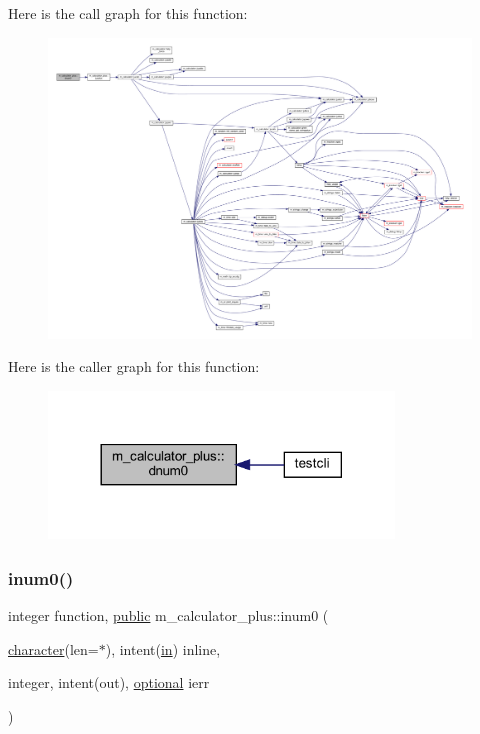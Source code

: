 Here is the call graph for this function\+:
\nopagebreak
\begin{figure}[H]
\begin{center}
\leavevmode
\includegraphics[width=350pt]{namespacem__calculator__plus_add45c0bb36bc796ee8a0354665f9397e_cgraph}
\end{center}
\end{figure}
Here is the caller graph for this function\+:
\nopagebreak
\begin{figure}[H]
\begin{center}
\leavevmode
\includegraphics[width=260pt]{namespacem__calculator__plus_add45c0bb36bc796ee8a0354665f9397e_icgraph}
\end{center}
\end{figure}
\mbox{\label{namespacem__calculator__plus_a3edbf94f311a3fad4a83fd8dfe26a61a}} 
\subsubsection{\texorpdfstring{inum0()}{inum0()}}
{\footnotesize\ttfamily integer function, \hyperlink{M__stopwatch_83_8txt_a2f74811300c361e53b430611a7d1769f}{public} m\+\_\+calculator\+\_\+plus\+::inum0 (\begin{DoxyParamCaption}\item[{\hyperlink{option__stopwatch_83_8txt_abd4b21fbbd175834027b5224bfe97e66}{character}(len=$\ast$), intent(\hyperlink{M__journal_83_8txt_afce72651d1eed785a2132bee863b2f38}{in})}]{inline,  }\item[{integer, intent(out), \hyperlink{option__stopwatch_83_8txt_aa4ece75e7acf58a4843f70fe18c3ade5}{optional}}]{ierr }\end{DoxyParamCaption})}



